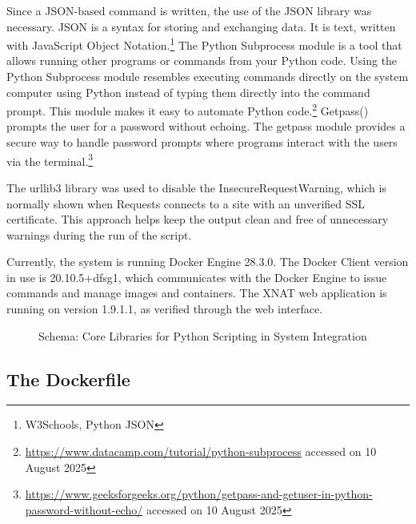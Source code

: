 Since a JSON-based command is written, the use of the JSON library was necessary. JSON is a syntax for storing and exchanging data. It is text, written with JavaScript Object Notation.\footnote{W3Schools, Python JSON}
The Python Subprocess module is a tool that allows running other programs or commands from your Python code. Using the Python Subprocess module resembles executing commands directly on the system computer using Python instead of typing them directly into the command prompt. This module makes it easy to automate Python code.\footnote{\url{https://www.datacamp.com/tutorial/python-subprocess} accessed on 10 August 2025}
Getpass() prompts the user for a password without echoing. The getpass module provides a secure way to handle password prompts where programs interact with the users via the terminal.\footnote{\url{https://www.geeksforgeeks.org/python/getpass-and-getuser-in-python-password-without-echo/} accessed on 10 August 2025}

The urllib3 library was used to disable the InsecureRequestWarning, which is normally shown when Requests connects to a site with an unverified SSL certificate. This approach helps keep the output clean and free of unnecessary warnings during the run of the script.

Currently, the system is running Docker Engine 28.3.0. The Docker Client version in use is 20.10.5+dfsg1, which communicates with the Docker Engine to issue commands and manage images and containers. The XNAT web application is running on version 1.9.1.1, as verified through the web interface.


\begin{figure}[ht]
  \centering
  \def\svgwidth{0.8\linewidth}
  
  \caption{Schema: Core Libraries for Python Scripting in System Integration}
  \label{fig:diagram-core-libraries}
\end{figure}
 
  \subsection{The Dockerfile}
 
